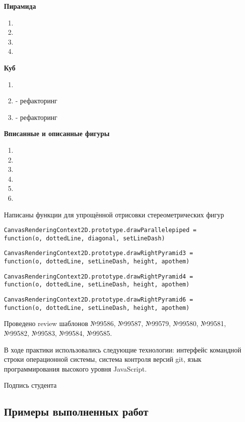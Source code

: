 \textbf{Пирамида}

\begin{enumerate}
	\item {}
	\item {}
	\item {}
	\item {}
\end{enumerate}

\textbf{Куб}

\begin{enumerate}
	\item {}
	\item {} - рефакторинг
	\item {} - рефакторинг
\end{enumerate}

\textbf{Вписанные и описанные фигуры}

\begin{enumerate}
	\item {}
	\item {}
	\item {}
	\item {}
	\item {}
	\item {}
\end{enumerate}

Написаны функции для упрощённой отрисовки стереометрических фигур

\texttt{CanvasRenderingContext2D.prototype.drawParallelepiped = \\ function(o, dottedLine, diagonal, setLineDash)}

\texttt{CanvasRenderingContext2D.prototype.drawRightPyramid3 = \\ function(o, dottedLine, setLineDash, height, apothem)}

\texttt{CanvasRenderingContext2D.prototype.drawRightPyramid4 = \\ function(o, dottedLine, setLineDash, height, apothem)}

\texttt{CanvasRenderingContext2D.prototype.drawRightPyramid6 = \\ function(o, dottedLine, setLineDash, height, apothem)}



Проведено review шаблонов 
№99586, 
№99587, 
№99579, 
№99580, 
№99581, 
№99582, 
№99583, 
№99584, 
№99585. 

В ходе практики использовались следующие технологии:
интерфейс командной строки операционной системы, система контроля версий
git, язык программирования высокого уровня JavaScript.

\begin{flushright}
	Подпись студента \underline{\hspace{3cm}}
\end{flushright}

\subsection*{Примеры выполненных работ}